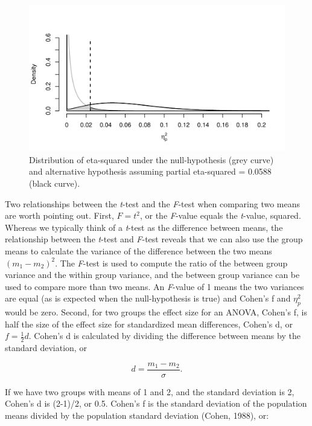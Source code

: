 \documentclass[,man,floatsintext]{apa6}
\begin{document}
\begin{figure}
\centering
\includegraphics{0.1_Simulation_Based_Power_Analysis_For_Factorial_ANOVA_Designs_files/figure-latex/eta-plot-1.pdf}
\caption{\label{fig:eta-plot}Distribution of eta-squared under the
null-hypothesis (grey curve) and alternative hypothesis assuming partial
eta-squared = 0.0588 (black curve).}
\end{figure}

Two relationships between the \emph{t}-test and the \emph{F}-test when
comparing two means are worth pointing out. First, \(F = t^2\), or the
\emph{F}-value equals the \emph{t}-value, squared. Whereas we typically
think of a \emph{t}-test as the difference between means, the
relationship between the \emph{t}-test and \emph{F}-test reveals that we
can also use the group means to calculate the variance of the difference
between the two means \((m_1 - m_2)^2\). The \emph{F}-test is used to
compute the ratio of the between group variance and the within group
variance, and the between group variance can be used to compare more
than two means. An \emph{F}-value of 1 means the two variances are equal
(as is expected when the null-hypothesis is true) and Cohen's f and
\(\eta_p^2\) would be zero. Second, for two groups the effect size for
an ANOVA, Cohen's f, is half the size of the effect size for
standardized mean differences, Cohen's d, or \(f = \frac{1}{2}d\).
Cohen's d is calculated by dividing the difference between means by the
standard deviation, or

\begin{equation}
d = \frac{m_1-m_2}{\sigma}.
\end{equation}

If we have two groups with means of 1 and 2, and the standard deviation
is 2, Cohen's d is (2-1)/2, or 0.5. Cohen's f is the standard deviation
of the population means divided by the population standard deviation
(Cohen, 1988), or:
\end{document}
